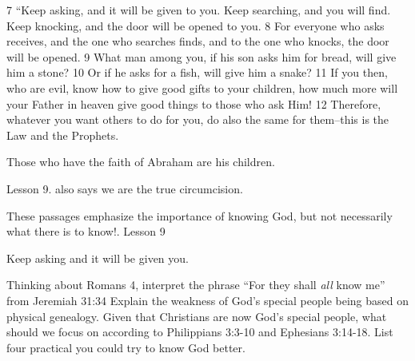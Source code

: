 \begin{bible}
7 ``Keep asking, and it will be given to you. Keep searching, and you will find. Keep knocking, and the door will be opened to you. 8 For everyone who asks receives, and the one who searches finds, and to the one who knocks, the door will be opened. 9 What man among you, if his son asks him for bread, will give him a stone? 10 Or if he asks for a fish, will give him a snake? 11 If you then, who are evil, know how to give good gifts to your children, how much more will your Father in heaven give good things to those who ask Him! 12 Therefore, whatever you want others to do for you, do also the same for them--this is the Law and the Prophets.

\end{bible}

\begin{discussion}


 Those who have the faith of Abraham are his children.

 Lesson 9. also says we are the true circumcision.


These passages emphasize the importance of knowing God, but not necessarily what there is to know!.
 Lesson 9


 Keep asking and it will be given you.

\end{discussion}

\begin{questions}
\q Thinking about Romans 4, interpret the phrase ``For they shall \emph{all} know me'' from Jeremiah 31:34
\q Explain the weakness of God's special people being based on physical genealogy.
\q Given that Christians are now God's special people, what should we focus on according to Philippians 3:3-10 and Ephesians 3:14-18.
\q List four practical you could try to know God better.
\end{questions}